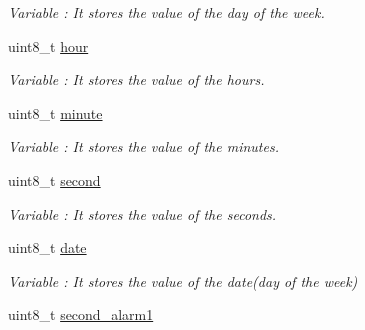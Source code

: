 \begin{DoxyCompactItemize}
\begin{DoxyCompactList}\small\item\em Variable \+: It stores the value of the day of the week. \end{DoxyCompactList}\item 
uint8\+\_\+t \hyperlink{class_wasp_r_t_c_a0b743dddae720f33e107233086e08e62}{hour}\hypertarget{class_wasp_r_t_c_a0b743dddae720f33e107233086e08e62}{}\label{class_wasp_r_t_c_a0b743dddae720f33e107233086e08e62}

\begin{DoxyCompactList}\small\item\em Variable \+: It stores the value of the hours. \end{DoxyCompactList}\item 
uint8\+\_\+t \hyperlink{class_wasp_r_t_c_adc5a10810d87d464a49b998936b48839}{minute}\hypertarget{class_wasp_r_t_c_adc5a10810d87d464a49b998936b48839}{}\label{class_wasp_r_t_c_adc5a10810d87d464a49b998936b48839}

\begin{DoxyCompactList}\small\item\em Variable \+: It stores the value of the minutes. \end{DoxyCompactList}\item 
uint8\+\_\+t \hyperlink{class_wasp_r_t_c_ada5488e4d4353b46588db98b7531afe4}{second}\hypertarget{class_wasp_r_t_c_ada5488e4d4353b46588db98b7531afe4}{}\label{class_wasp_r_t_c_ada5488e4d4353b46588db98b7531afe4}

\begin{DoxyCompactList}\small\item\em Variable \+: It stores the value of the seconds. \end{DoxyCompactList}\item 
uint8\+\_\+t \hyperlink{class_wasp_r_t_c_afc2f32d6e3915726394eb5f0a52920fc}{date}\hypertarget{class_wasp_r_t_c_afc2f32d6e3915726394eb5f0a52920fc}{}\label{class_wasp_r_t_c_afc2f32d6e3915726394eb5f0a52920fc}

\begin{DoxyCompactList}\small\item\em Variable \+: It stores the value of the date(day of the week) \end{DoxyCompactList}\item 
uint8\+\_\+t \hyperlink{class_wasp_r_t_c_ac72f182d7a587dbb90ab0a055e2b35ce}{second\+\_\+alarm1}\hypertarget{class_wasp_r_t_c_ac72f182d7a587dbb90ab0a055e2b35ce}{}\label{class_wasp_r_t_c_ac72f182d7a587dbb90ab0a055e2b35ce}


\end{DoxyCompactItemize}
